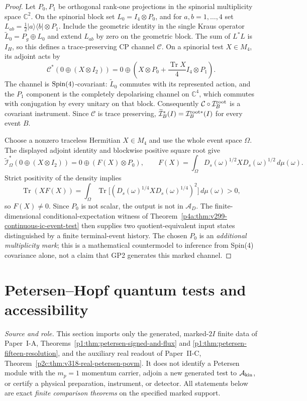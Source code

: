 \documentclass[12pt,a4paper]{article}
\begin{document}
\begin{proof}
Let $P_0,P_1$ be orthogonal rank-one projections in the spinorial
multiplicity space $\mathbb C^2$. On the spinorial block set
$L_0=I_4\otimes P_0$, and for $a,b=1,\ldots,4$ set
$L_{ab}=\frac12|a\rangle\langle b|\otimes P_1$. Include the
geometric identity in the single Kraus operator
$\widetilde L_0=P_g\oplus L_0$ and extend $L_{ab}$ by zero on the
geometric block. The sum of $L^*L$ is $I_H$, so this defines a
trace-preserving CP channel $\mathcal C$. On a spinorial test
$X\in M_4$, its adjoint acts by
\[
 \mathcal C^*(0\oplus(X\otimes I_2))
  =0\oplus\left(X\otimes P_0+
                 \frac{\operatorname{Tr}X}{4}I_4\otimes P_1\right).
\]
The channel is $\mathrm{Spin}(4)$-covariant: $\widetilde L_0$
commutes with its represented action, and the $P_1$ component
is the completely depolarising channel on $\mathbb C^4$,
which commutes with conjugation by every unitary on that block.
Consequently $\mathcal C\circ\mathcal I_B^{\rm root}$ is a
covariant instrument. Since $\mathcal C$ is trace preserving,
$\widetilde{\mathcal I}_B^*(I)=\mathcal I_B^{\rm root*}(I)$
for every event $B$.

Choose a nonzero traceless Hermitian $X\in M_4$ and use the whole
event space $\Omega$. The displayed adjoint identity and
blockwise positive square root give
\[
 \widetilde{\mathcal I}_\Omega^*(0\oplus(X\otimes I_2))
 =0\oplus(F(X)\otimes P_0),\qquad
 F(X)=\int_\Omega D_s(\omega)^{1/2}X
                       D_s(\omega)^{1/2}\,d\mu(\omega).
\]
Strict positivity of the density implies
\[
 \operatorname{Tr}(XF(X))
 =\int_\Omega \operatorname{Tr}\!
 \bigl[(D_s(\omega)^{1/4}X D_s(\omega)^{1/4})^2\bigr]
 \,d\mu(\omega)>0,
\]
so $F(X)\ne0$. Since $P_0$ is not scalar, the output is not in
$\mathcal A_D$. The finite-dimensional conditional-expectation
witness of
Theorem~\ref{p4a:thm:v299-continuous-ic-event-test}
then supplies two quotient-equivalent input states distinguished
by a finite terminal-event history. The chosen $P_0$ is an
\emph{additional multiplicity mark}; this is a mathematical
countermodel to inference from Spin(4) covariance alone, not a
claim that GP2 generates this marked channel.
\end{proof}

\section{Petersen--Hopf quantum tests and accessibility}
\label{p4a:sec:v320-petersen-quantum}
\noindent\textit{Source and role.} This section imports only the generated,
marked-$2I$ finite data of Paper~I-A,
Theorems~\ref{p1:thm:petersen-signed-and-flux} and
\ref{p1:thm:petersen-fifteen-resolution}, and the auxiliary real
readout of Paper~II-C,
Theorem~\ref{p2c:thm:v318-real-petersen-povm}.
It does not identify a Petersen module with the $m_p=1$ momentum
carrier, adjoin a new generated test to $\mathcal A_{\rm kin}$,
or certify a physical preparation, instrument, or detector.
All statements below are exact \emph{finite comparison theorems} on the
specified marked support.
\end{document}
